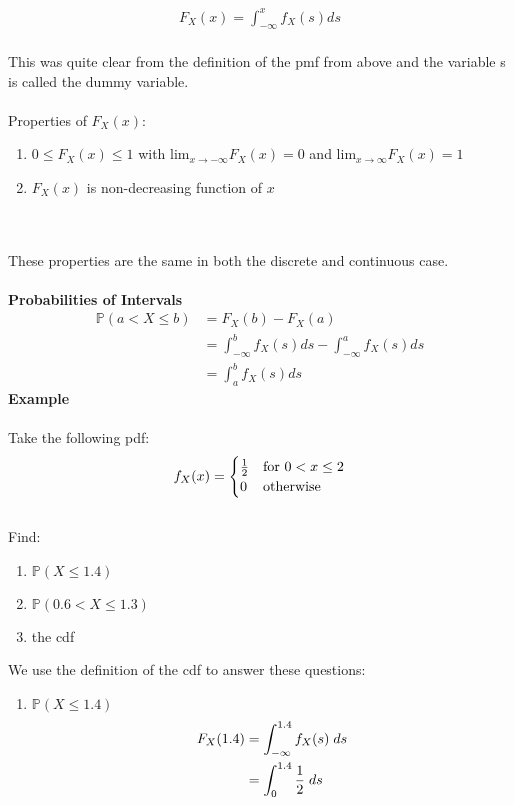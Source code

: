 \documentclass[,oneside]{article}
\begin{document}
\begin{enumerate}
\begin{align*}
F_X(x)= \int_{-\infty }^{x} f_X(s) ds
\end{align*}\\
This was quite clear from the definition of the pmf from above and the variable s is called the dummy variable. \\ \\
Properties of $F_X(x)$:\\ 
\begin{enumerate}
\item $0 \leq F_X(x) \leq 1$ with lim$_{x \rightarrow -\infty} F_X(x) = 0$ and  lim$_{x \rightarrow \infty} F_X(x) = 1$
\item $F_X(x)$ is non-decreasing function of $x$
\end{enumerate}\\ \\
These properties are the same in both the discrete and continuous case.\\ \\
\textbf{Probabilities of Intervals}
\begin{align*}
\mathbb{P}(a < X \leq b) &= F_X(b) - F_X(a) \\
&=\int_{-\infty}^{b} f_X(s) ds - \int_{-\infty}^{a} f_X(s) ds \\
&= \int_{a}^{b} f_X(s) ds 
\end{align*}
\textbf{Example}\\
\\Take the following pdf:
\[
f_X(x) =
\begin{cases}
\frac{1}{2} & \text{for } 0 < x \leq 2 \\
0 & $otherwise$
\end{cases} \] \\
Find:
\begin{enumerate}
\item $ \mathbb{P}(X \leq 1.4)$
\item $ \mathbb{P}(0.6 < X \leq 1.3)$
\item the cdf 
\end{enumerate}
We use the definition of the cdf to answer these questions:
\begin{enumerate}
\item $ \mathbb{P}(X \leq 1.4)$
\begin{align*}
F_X(1.4) &= \int_{-\infty}^{1.4} f_X(s) \hspace{0.1cm}ds \\
&=  \int_{0}^{1.4} \frac{1}{2} \hspace{0.1cm}ds \\

\end{align*}
\end{enumerate}
\end{enumerate}
\end{document}
